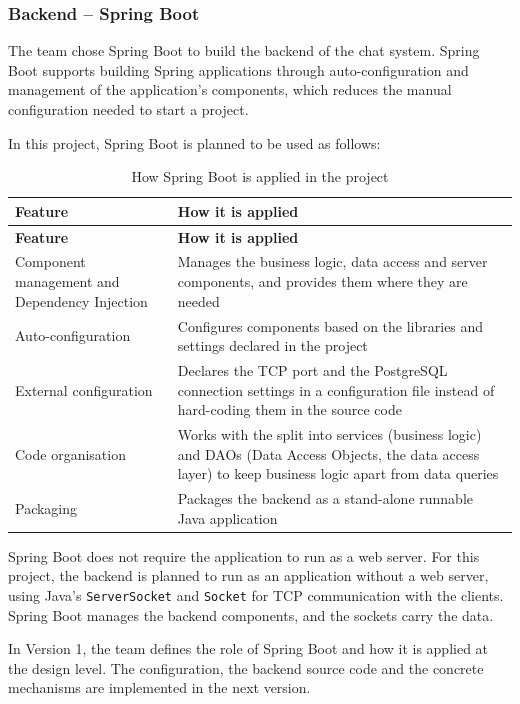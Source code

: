 \subsubsection{Backend -- Spring Boot}
\label{subsubsec:backend-spring-boot}

The team chose Spring Boot to build the backend of the chat system. Spring Boot
supports building Spring applications through auto-configuration and management
of the application's components, which reduces the manual configuration needed
to start a project.

In this project, Spring Boot is planned to be used as follows:

\begingroup
\small
\begin{longtable}{|L{4.6cm}|L{\dimexpr\textwidth-4.6cm-4\arrayrulewidth\relax}|}
  \caption{How Spring Boot is applied in the project}
  \label{tab:spring-boot-usage}\\
  \hline
  \textbf{Feature} & \textbf{How it is applied}\\
  \hline
  \endfirsthead
  \hline
  \textbf{Feature} & \textbf{How it is applied}\\
  \hline
  \endhead
  Component management and Dependency Injection &
  Manages the business logic, data access and server components, and
  provides them where they are needed\\
  \hline
  Auto-configuration &
  Configures components based on the libraries and settings declared
  in the project\\
  \hline
  External configuration &
  Declares the TCP port and the PostgreSQL connection settings in a configuration
  file instead of hard-coding them in the source code\\
  \hline
  Code organisation &
  Works with the split into services (business logic) and DAOs
  (Data Access Objects, the data access layer) to keep business logic
  apart from data queries\\
  \hline
  Packaging &
  Packages the backend as a stand-alone runnable Java application\\
  \hline
\end{longtable}
\endgroup

Spring Boot does not require the application to run as a web server.
For this project, the backend is planned to run as an application without a web
server, using Java's \texttt{ServerSocket} and \texttt{Socket} for TCP
communication with the clients. Spring Boot manages the backend components,
and the sockets carry the data.

In Version 1, the team defines the role of Spring Boot and how it is applied at
the design level. The configuration, the backend source code and the concrete
mechanisms are implemented in the next version.
